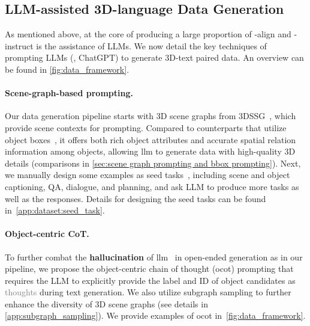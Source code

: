 \documentclass{article}
\begin{document}
\subsection{LLM-assisted 3D-language Data Generation}\label{sec:data:generation}
As mentioned above, at the core of producing a large proportion of \agent-align and \agent-instruct is the assistance of LLMs. We now detail the key techniques of prompting LLMs (\ie, ChatGPT) to generate 3D-text paired data. An overview can be found in \cref{fig:data_framework}.

\paragraph{Scene-graph-based prompting.} Our data generation pipeline starts with 3D scene graphs from 3DSSG~\citep{wu2021scenegraphfusion}, which provide scene contexts for prompting. 
Compared to counterparts that utilize object boxes~\citep{yin2023lamm,hong20233d,wang2023chat}, it offers both rich object attributes and accurate spatial relation information among objects, allowing \ac{llm} to generate data with high-quality 3D details (comparisons in \cref{sec:scene graph prompting and bbox prompting}). Next, we manually design some examples as seed tasks~\cite{liu2023visual}, including scene and object captioning, QA, dialogue, and planning, and ask LLM to produce more tasks as well as the responses. Details for designing the seed tasks can be found in~\cref{app:dataset:seed_task}.

\paragraph{Object-centric CoT.} To further combat the \textbf{hallucination} of \ac{llm}~\citep{bang2023hallucination} in open-ended generation as in our pipeline, we propose the object-centric chain of thought (\ac{ocot}) prompting that requires the LLM to explicitly provide the label and ID of object candidates as \textcolor{gray}{thoughts} during text generation. We also utilize subgraph sampling to further enhance the diversity of 3D scene graphs (see details in \cref{app:subgraph_sampling}). We provide examples of \ac{ocot} in~\cref{fig:data_framework}. 
\end{document}
